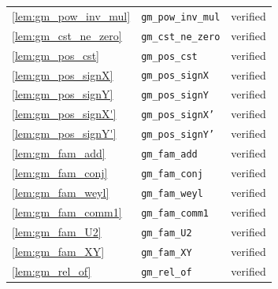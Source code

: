 \documentclass[11pt]{article}
\theoremstyle{definition}
\theoremstyle{remark}
\begin{document}
\begin{longtable}{@{}lll@{}}
\cref{lem:gm_pow_inv_mul} & \texttt{gm\_pow\_inv\_mul} & verified \\
\cref{lem:gm_cst_ne_zero} & \texttt{gm\_cst\_ne\_zero} & verified \\
\cref{lem:gm_pos_cst} & \texttt{gm\_pos\_cst} & verified \\
\cref{lem:gm_pos_signX} & \texttt{gm\_pos\_signX} & verified \\
\cref{lem:gm_pos_signY} & \texttt{gm\_pos\_signY} & verified \\
\cref{lem:gm_pos_signX'} & \texttt{gm\_pos\_signX'} & verified \\
\cref{lem:gm_pos_signY'} & \texttt{gm\_pos\_signY'} & verified \\
\cref{lem:gm_fam_add} & \texttt{gm\_fam\_add} & verified \\
\cref{lem:gm_fam_conj} & \texttt{gm\_fam\_conj} & verified \\
\cref{lem:gm_fam_weyl} & \texttt{gm\_fam\_weyl} & verified \\
\cref{lem:gm_fam_comm1} & \texttt{gm\_fam\_comm1} & verified \\
\cref{lem:gm_fam_U2} & \texttt{gm\_fam\_U2} & verified \\
\cref{lem:gm_fam_XY} & \texttt{gm\_fam\_XY} & verified \\
\cref{lem:gm_rel_of} & \texttt{gm\_rel\_of} & verified \\
\bottomrule
\end{longtable}
\end{document}
